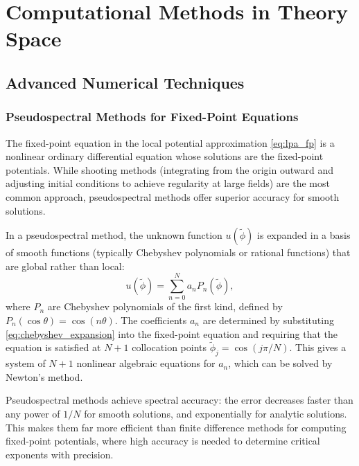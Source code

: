 \documentclass[11pt, twoside, openright]{book}
\theoremstyle{dotted}
\theoremstyle{definition}
\begin{document}
\part{Computational Methods in Theory Space}

\chapter{Advanced Numerical Techniques}
\label{ch:advanced_numerical}

\section{Pseudospectral Methods for Fixed-Point Equations}

The fixed-point equation in the local potential approximation \eqref{eq:lpa_fp}
is a nonlinear ordinary differential equation whose solutions are the fixed-point
potentials. While shooting methods (integrating from the origin outward and
adjusting initial conditions to achieve regularity at large fields) are the most
common approach, pseudospectral methods offer superior accuracy for smooth solutions.

In a pseudospectral method, the unknown function $u(\tilde\phi)$ is expanded in
a basis of smooth functions (typically Chebyshev polynomials or rational functions)
that are global rather than local:
\begin{equation}
  u(\tilde\phi) = \sum_{n=0}^N a_n P_n(\tilde\phi),
  \label{eq:chebyshev_expansion}
\end{equation}
where $P_n$ are Chebyshev polynomials of the first kind, defined by $P_n(\cos\theta)
= \cos(n\theta)$. The coefficients $a_n$ are determined by substituting
\eqref{eq:chebyshev_expansion} into the fixed-point equation and requiring that
the equation is satisfied at $N+1$ collocation points $\tilde\phi_j = \cos(j\pi/N)$.
This gives a system of $N+1$ nonlinear algebraic equations for $a_n$, which can
be solved by Newton's method.

Pseudospectral methods achieve spectral accuracy: the error decreases faster than
any power of $1/N$ for smooth solutions, and exponentially for analytic solutions.
This makes them far more efficient than finite difference methods for computing
fixed-point potentials, where high accuracy is needed to determine critical exponents
with precision.
\end{document}
